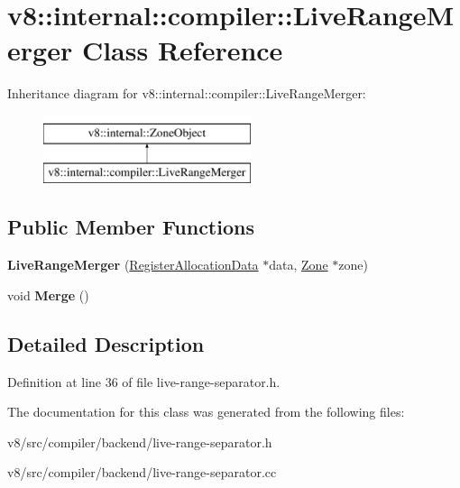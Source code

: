 \hypertarget{classv8_1_1internal_1_1compiler_1_1LiveRangeMerger}{}\section{v8\+:\+:internal\+:\+:compiler\+:\+:Live\+Range\+Merger Class Reference}
\label{classv8_1_1internal_1_1compiler_1_1LiveRangeMerger}
Inheritance diagram for v8\+:\+:internal\+:\+:compiler\+:\+:Live\+Range\+Merger\+:\begin{figure}[H]
\begin{center}
\leavevmode
\includegraphics[height=2.000000cm]{classv8_1_1internal_1_1compiler_1_1LiveRangeMerger}
\end{center}
\end{figure}
\subsection*{Public Member Functions}
\begin{DoxyCompactItemize}
\item 
\mbox{\label{classv8_1_1internal_1_1compiler_1_1LiveRangeMerger_a6f8f024ad5b819a2d19880cfdcb36627}} 
{\bfseries Live\+Range\+Merger} (\mbox{\hyperlink{classv8_1_1internal_1_1compiler_1_1RegisterAllocationData}{Register\+Allocation\+Data}} $\ast$data, \mbox{\hyperlink{classv8_1_1internal_1_1Zone}{Zone}} $\ast$zone)
\item 
\mbox{\label{classv8_1_1internal_1_1compiler_1_1LiveRangeMerger_a762ac8fa9295f964b5746cae25d42081}} 
void {\bfseries Merge} ()
\end{DoxyCompactItemize}


\subsection{Detailed Description}


Definition at line 36 of file live-\/range-\/separator.\+h.



The documentation for this class was generated from the following files\+:\begin{DoxyCompactItemize}
\item 
v8/src/compiler/backend/live-\/range-\/separator.\+h\item 
v8/src/compiler/backend/live-\/range-\/separator.\+cc\end{DoxyCompactItemize}
